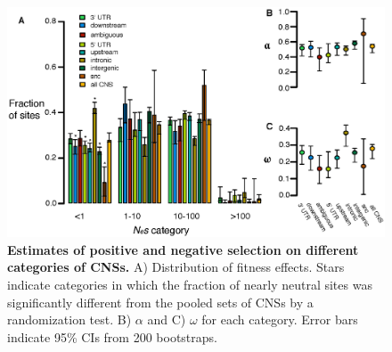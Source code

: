 \begin{figure}[ht!]
      \centering
       \includegraphics[width=\linewidth]{Ch2FigS7}
    \caption{\textbf{Estimates of positive and negative selection on different categories of CNSs.} A) Distribution of fitness effects. Stars indicate categories in which the fraction of nearly neutral sites was significantly different from the pooled sets of CNSs by a randomization test. B) $\alpha$ and C) $\omega$ for each category. Error bars indicate 95\% CIs from 200 bootstraps.}
    \label{fig:figS7}
\end{figure}

